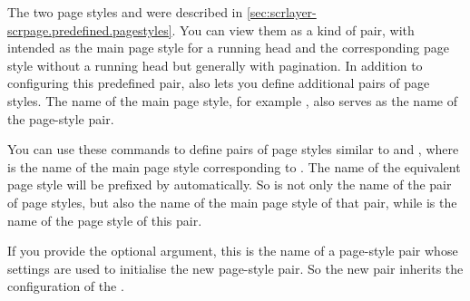 The two page styles  and 
were described in \autoref{sec:scrlayer-scrpage.predefined.pagestyles}. You
can view them as a kind of pair, with  intended as the
main page style for a running head and  the
corresponding  page style without a running head but
generally with pagination. In addition to configuring this predefined pair,
 also lets you define additional pairs of page
styles. The name of the main page style, for example ,
also serves as the name of the page-style pair.


\begin{Declaration}
\end{Declaration}
You can use these commands to define pairs of page styles similar to
 and , where 
is the name of the main page style corresponding to .
The name of the equivalent  page style will be prefixed by
 automatically. So  is not only the name of the
pair of page styles, but also the name of the main page style of that pair,
while  is the name of the  page
style of this pair.

If you provide the optional  argument, this is the name of
a page-style pair whose settings are used to initialise the new page-style
pair. So the new pair inherits the configuration of the .

